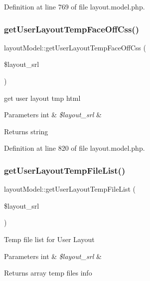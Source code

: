 Definition at line 769 of file layout.\+model.\+php.

\mbox{\label{classlayoutModel_aadc68d3ed9d3706536ff8d93d1aebd56}} 
\subsubsection{\texorpdfstring{get\+User\+Layout\+Temp\+Face\+Off\+Css()}{getUserLayoutTempFaceOffCss()}}
{\footnotesize\ttfamily layout\+Model\+::get\+User\+Layout\+Temp\+Face\+Off\+Css (\begin{DoxyParamCaption}\item[{}]{\$layout\+\_\+srl }\end{DoxyParamCaption})}

get user layout tmp html 
\begin{DoxyParams}[1]{Parameters}
int & {\em \$layout\+\_\+srl} & \\
\hline
\end{DoxyParams}
\begin{DoxyReturn}{Returns}
string 
\end{DoxyReturn}


Definition at line 820 of file layout.\+model.\+php.

\mbox{\label{classlayoutModel_a64f8b7f26a864b7c64d491a83bbf3961}} 
\subsubsection{\texorpdfstring{get\+User\+Layout\+Temp\+File\+List()}{getUserLayoutTempFileList()}}
{\footnotesize\ttfamily layout\+Model\+::get\+User\+Layout\+Temp\+File\+List (\begin{DoxyParamCaption}\item[{}]{\$layout\+\_\+srl }\end{DoxyParamCaption})}

Temp file list for User Layout 
\begin{DoxyParams}[1]{Parameters}
int & {\em \$layout\+\_\+srl} & \\
\hline
\end{DoxyParams}
\begin{DoxyReturn}{Returns}
array temp files info 
\end{DoxyReturn}


